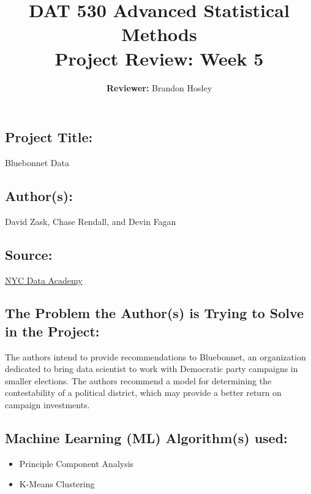 \documentclass[]{article}
\title{\textbf{DAT 530 Advanced Statistical Methods}\\
	\normalsize{Project Review: Week 5} }
\author{\textbf{Reviewer: }
	Brandon Hosley}
\begin{document}
\setlength{\droptitle}{-10em} 
\pretitle{\begin{flushleft}\LARGE} %
	\posttitle{\end{flushleft}}
\preauthor{\begin{flushleft}\large} %
	\postauthor{\end{flushleft}}
\predate{\begin{flushleft}\large} %
	\postdate{\end{flushleft}}
\maketitle

\vspace{-2em}

\subsection*{Project Title:}
Bluebonnet Data

\subsection*{Author(s):}
David Zask, Chase Rendall, and Devin Fagan

\subsection*{Source:}
\href{https://nycdatascience.com/blog/student-works/bluebonnet-data/}{NYC Data Academy}

\subsection*{The Problem the Author(s) is Trying to Solve in the Project:}
The authors intend to provide recommendations to Bluebonnet, 
an organization dedicated to bring data scientist to work with Democratic party campaigns in smaller elections.
The authors recommend a model for determining the contestability of a political district, which may provide a better return on campaign investments.

\subsection*{Machine Learning (ML) Algorithm(s) used:}
\begin{itemize}
	\item Principle Component Analysis
	\item K-Means Clustering
\end{itemize}
\end{document}
